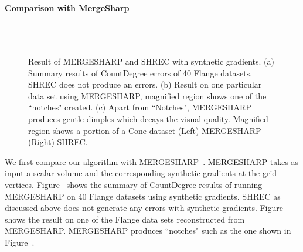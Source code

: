 \paragraph{Comparison with MergeSharp}
\begin{figure}[htb]
	\centering
	\\
	\\
	\caption{Result of  MERGESHARP and SHREC with synthetic gradients. (a) Summary results of  CountDegree errors of 40 Flange datasets. SHREC does not produce an errors. (b) Result on one particular data set using MERGESHARP, magnified region shows one of the ``notches" created. (c) Apart from ``Notches", MERGESHARP produces gentle dimples which decays the visual quality. Magnified region shows a portion of a Cone dataset (Left) MERGESHARP (Right) SHREC. }
	\label{fig:mergeSharpVShrec}
\end{figure}	
We first compare our algorithm with MERGESHARP~\cite{bw-cisec-13}. MERGESHARP takes as input a scalar volume and the corresponding synthetic gradients at the grid vertices. Figure~\protect{} shows the summary of CountDegree results of running MERGESHARP on 40 Flange datasets using synthetic gradients. SHREC as discussed above does not generate any errors with synthetic gradients. Figure~\protect{} shows the result on one of the Flange data sets  reconstructed from MERGESHARP. MERGESHARP produces ``notches" such as the one shown in Figure~\protect{}.

